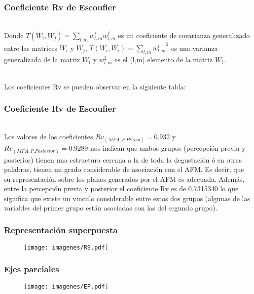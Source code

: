 \documentclass[12pt]{beamer}
\begin{document}
\begin{frame}
\justifying
\frametitle{Coeficiente Rv de Escoufier}
~\\Donde $T(W_i,W_j)=\sum\limits_{l,m}w_{l,m}^i w_{l,m}^j$ es un coeficiente de covarianza generalizado entre las matrices $W_i$ y $W_j$, $T(W_i,W_i)=\sum\limits_{l,m}{w_{l,m}^i}^2 $ es una varianza generalizada de la matriz $W_i$ y $w_{l,m}^2$ es el (l,m) elemento de la matriz $W_i$.

~\\Los coeficientes Rv se pueden observar en la siguiente tabla:
\begin{center}
\end{center}
\end{frame}

\begin{frame}
\justifying
\frametitle{Coeficiente Rv de Escoufier}
~\\Los valores de los coeficientes $Rv_{(MFA,P.Previa)}=0.932$ y $Rv_{(MFA,P.Posterior)}=0.9289$ nos indican que ambos grupos (percepción previa y posterior) tienen una estructura cercana a la de toda la degustación ó en otras palabras, tienen un grado considerable de asociación con el AFM. Es decir, que su representación sobre los planos generados por el AFM es adecuada. Además, entre la percepción previa y posterior el coeficiente Rv es de 0.7315340 lo que significa que existe un vinculo considerable entre estos dos grupos (algunas de las variables del primer grupo están asociadas con las del segundo grupo).
\end{frame}

\begin{frame}
\frametitle{Representación superpuesta}
\begin{figure}[h]
  \centering
  \texttt{[image: imagenes/RS.pdf]}
\end{figure}
\end{frame}

\begin{frame}
\frametitle{Ejes parciales}
\begin{figure}[h]
  \centering
  \texttt{[image: imagenes/EP.pdf]}
\end{figure}
\end{frame}
\end{document}
